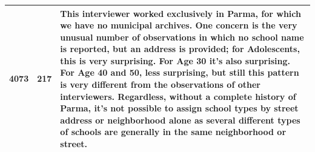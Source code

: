 \begin{table}[H]
\begin{footnotesize}
\begin{tabular}{L{2cm} L{2cm} L{11cm}}
4073	&	217	&	This interviewer worked exclusively in Parma, for which we have no municipal archives. One concern is the very unusual number of observations in which no school name is reported, but an address is provided; for Adolescents, this is very surprising. For Age 30 it's also surprising. For Age 40 and 50, less surprising, but still this pattern is very different from the observations of other interviewers. Regardless, without a complete history of Parma, it's not possible to assign school types by street address or neighborhood alone as several different types of schools are generally in the same neighborhood or street.	\\	\bottomrule

\end{tabular}

\end{footnotesize}
\end{table}

